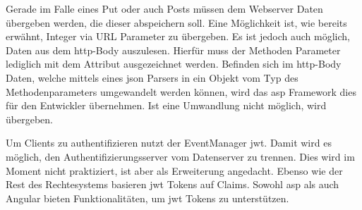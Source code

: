\label{nullParam}
Gerade im Falle eines Put oder auch Posts müssen dem Webserver Daten übergeben werden, die dieser abspeichern soll. Eine Möglichkeit ist, wie bereits erwähnt, Integer via URL Parameter zu übergeben. Es ist jedoch auch möglich, Daten aus dem \gls{http}-Body auszulesen. Hierfür muss der Methoden Parameter lediglich mit dem \lstcode{[FromBody]} Attribut ausgezeichnet werden. Befinden sich im \gls{http}-Body Daten, welche mittels eines \gls{json} Parsers in ein Objekt vom Typ des Methodenparameters umgewandelt werden können, wird das \gls{asp} Framework dies für den Entwickler übernehmen. Ist eine Umwandlung nicht möglich, wird  übergeben.


 \label{jwt}
Um Clients zu authentifizieren nutzt der EventManager \gls{jwt}. Damit wird es möglich, den Authentifizierungsserver vom Datenserver zu trennen. Dies wird im Moment nicht praktiziert, ist aber als Erweiterung angedacht. Ebenso wie der Rest des Rechtesystems basieren \gls{jwt} Tokens auf Claims. Sowohl \gls{asp} als auch Angular bieten Funktionalitäten, um \gls{jwt} Tokens zu unterstützen.
